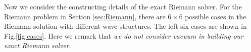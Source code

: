 \documentclass{article}
\numberwithin{equation}{section}
\numberwithin{table}{section}
\begin{document}

Now we consider the constructing details of the exact  Riemann  solver. For  the Riemann problem in Section \ref{sec:Riemann}, there are  $6\times 6$ possible  cases in the Riemann solution with different wave structures.  The left six cases are  shown in Fig.\ref{fig:cases}. Here we remark that \emph{we do not consider vacuum in building our exact Riemann solver}.
\end{document}

